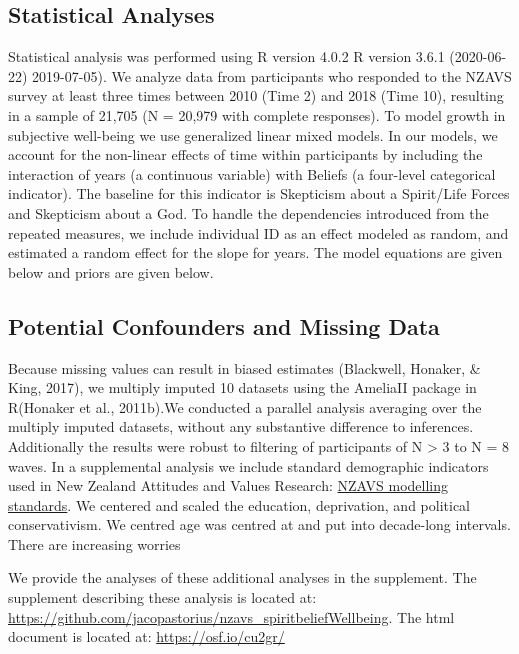 \documentclass[
  english,
  man,floatsintext]{apa6}
\begin{document}
\hypertarget{statistical-analyses}{%
\subsection{Statistical Analyses}\label{statistical-analyses}}

Statistical analysis was performed using R version 4.0.2 R version 3.6.1 (2020-06-22) 2019-07-05). We analyze data from participants who responded to the NZAVS survey at least three times between 2010 (Time 2) and 2018 (Time 10), resulting in a sample of 21,705 (N = 20,979 with complete responses). To model growth in subjective well-being we use generalized linear mixed models. In our models, we account for the non-linear effects of time within participants by including the interaction of years (a continuous variable) with Beliefs (a four-level categorical indicator). The baseline for this indicator is Skepticism about a Spirit/Life Forces and Skepticism about a God. To handle the dependencies introduced from the repeated measures, we include individual ID as an effect modeled as random, and estimated a random effect for the slope for years. The model equations are given below and priors are given below.

\hypertarget{potential-confounders-and-missing-data}{%
\subsection{Potential Confounders and Missing Data}\label{potential-confounders-and-missing-data}}

Because missing values can result in biased estimates (Blackwell, Honaker, \& King, 2017), we multiply imputed 10 datasets using the AmeliaII package in R(Honaker et al., 2011b).We conducted a parallel analysis averaging over the multiply imputed datasets, without any substantive difference to inferences. Additionally the results were robust to filtering of participants of N \textgreater{} 3 to N = 8 waves. In a supplemental analysis we include standard demographic indicators used in New Zealand Attitudes and Values Research: \href{https://cdn.auckland.ac.nz/assets/psych/about/our-research/nzavs/NZAVSTechnicalDocuments/NZAVS-Technical-Documents-e11-Default-Statistical-Standards.pdf}{NZAVS modelling standards}. We centered and scaled the education, deprivation, and political conservativism. We centred age was centred at and put into decade-long intervals. There are increasing worries

We provide the analyses of these additional analyses in the supplement. The supplement describing these analysis is located at: \url{https://github.com/jacopastorius/nzavs_spiritbeliefWellbeing}. The html document is located at: \url{https://osf.io/cu2gr/}
\end{document}
